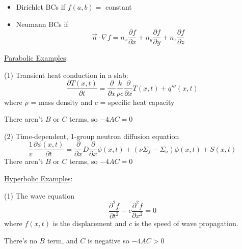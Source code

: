 \documentclass[12pt]{article}
\newcommand{\Macro}{\ensuremath{\Sigma}}
\begin{document}
\begin{itemize}
\item Dirichlet BCs if $f(a,b) =$ constant
\item Neumann BCs if 
\begin{equation}
\vec{n} \cdot \nabla f = n_x \frac{\partial f} {\partial x} + n_y \frac{\partial f} {\partial y}  +n_z \frac{\partial f} {\partial z} \nonumber
\end{equation}
\end{itemize}

\vspace*{1em}
\noindent \underline{Parabolic Examples}:

(1) Transient heat conduction in a slab:
%
\begin{equation}
\frac{\partial T(x,t)}{\partial t} = \frac{\partial}{\partial x} \frac{k}{\rho c} \frac{\partial}{\partial x} T(x,t) + q'''(x,t) \nonumber
\end{equation}
%
where $\rho$ = mass density and $c$ = specific heat capacity

\noindent There aren't $B$ or $C$ terms, so $-4AC = 0$


\vspace*{2em}
(2) Time-dependent, 1-group neutron diffusion equation
%
\begin{equation}
\frac{1}{v} \frac{\partial \phi(x,t)}{\partial t} = \frac{\partial}{\partial x} D \frac{\partial}{\partial x} \phi(x,t) + (\nu \Macro_f - \Macro_a) \phi(x,t) + S(x,t) \nonumber
\end{equation}
%
There aren't $B$ or $C$ terms, so $-4AC = 0$

\vspace*{1em}
\noindent \underline{Hyperbolic Examples}:

(1) The wave equation
%
\begin{equation}
\frac{\partial^2 f}{\partial t^2} - c \frac{\partial^2 f}{\partial x^2} = 0
\end{equation}
%
where $f(x,t)$ is the displacement and $c$ is the speed of wave propagation.

\noindent There's no $B$ term, and $C$ is negative so $-4AC > 0$


\end{document}
